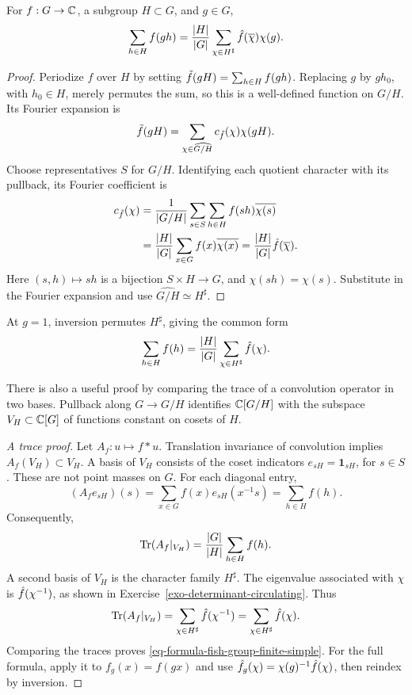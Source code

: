 \begin{thm}
For $f:G\to\mathbb{C}$, a subgroup $H\subset G$, and $g\in G$,
\begin{equation}
\label{eq-formula-fish-finished-grp}
 \sum_{h\in H}f(gh)
 =\frac{|H|}{|G|}\sum_{\chi\in H^\sharp}\hat{f}(\overline{\chi})\chi(g).
\end{equation}
\end{thm}
\begin{proof}
Periodize $f$ over $H$ by setting
$\tilde{f}(gH)=\sum_{h\in H}f(gh)$.
Replacing $g$ by $gh_0$, with $h_0\in H$, merely permutes the sum, so this
is a well-defined function on $G/H$.
Its Fourier expansion is
\begin{equation}
\label{eq-demo-formuel-fish-gpe-finite-tmp}
 \tilde{f}(gH)=\sum_{\chi\in\widehat{G/H}}
                c_{\tilde{f}}(\chi)\chi(gH).
\end{equation}
Choose representatives $S$ for $G/H$. Identifying each quotient character
with its pullback, its Fourier coefficient is
\begin{align}
\label{eq-formula-fish-intermediate-result}
 c_{\tilde{f}}(\chi)
 &=\frac1{|G/H|}\sum_{s\in S}\sum_{h\in H}f(sh)\overline{\chi(s)}\nonumber\\
 &=\frac{|H|}{|G|}\sum_{x\in G}f(x)\overline{\chi(x)}
 =\frac{|H|}{|G|}\hat{f}(\overline{\chi}).
\end{align}
Here $(s,h)\mapsto sh$ is a bijection $S\times H\to G$, and $\chi(sh)=\chi(s)$.
Substitute in the Fourier expansion and use
$\widehat{G/H}\simeq H^\sharp$.
\end{proof}
At $g=1$, inversion permutes $H^\sharp$, giving the common form
\begin{equation}
\label{eq-formula-fish-group-finite-simple}
 \sum_{h\in H}f(h)=\frac{|H|}{|G|}
                       \sum_{\chi\in H^\sharp}\hat{f}(\chi).
\end{equation}

There is also a useful proof by comparing the trace of a convolution operator
in two bases. Pullback along $G\to G/H$ identifies $\mathbb{C}[G/H]$ with the
subspace $V_H\subset\mathbb{C}[G]$ of functions constant on cosets of $H$.

\begin{proof}[A trace proof]
Let $A_f:u\mapsto f*u$. Translation invariance of convolution implies
$A_f(V_H)\subset V_H$. A basis of $V_H$ consists of the coset indicators
$e_{sH}=\mathbf{1}_{sH}$, for $s\in S$. These are not point masses on $G$.
For each diagonal entry,
\[
 (A_fe_{sH})(s)=\sum_{x\in G}f(x)e_{sH}(x^{-1}s)
 =\sum_{h\in H}f(h).
\]
Consequently,
\[
 \operatorname{Tr}(A_f|_{V_H})=\frac{|G|}{|H|}\sum_{h\in H}f(h).
\]
A second basis of $V_H$ is the character family $H^\sharp$.
The eigenvalue associated with $\chi$ is $\hat{f}(\chi^{-1})$, as shown in
Exercise~\ref{exo-determinant-circulating}. Thus
\[
 \operatorname{Tr}(A_f|_{V_H})=\sum_{\chi\in H^\sharp}\hat{f}(\chi^{-1})
 =\sum_{\chi\in H^\sharp}\hat{f}(\chi).
\]
Comparing the traces proves \eqref{eq-formula-fish-group-finite-simple}.
For the full formula, apply it to $f_g(x)=f(gx)$ and use
$\hat{f}_g(\chi)=\chi(g)^{-1}\hat{f}(\chi)$, then reindex by inversion.
\end{proof}

